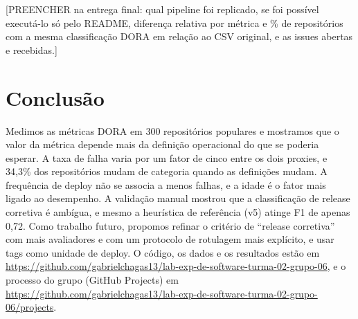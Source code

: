 \documentclass[12pt]{article}
\begin{document}
[PREENCHER na entrega final: qual pipeline foi replicado, se foi possível
executá-lo só pelo README, diferença relativa por métrica e \% de repositórios
com a mesma classificação DORA em relação ao CSV original, e as issues abertas
e recebidas.]

\section{Conclusão}

Medimos as métricas DORA em 300 repositórios populares e mostramos que o valor
da métrica depende mais da definição operacional do que se poderia esperar. A
taxa de falha varia por um fator de cinco entre os dois proxies, e 34,3\%
dos repositórios mudam de categoria quando as definições mudam. A frequência de
deploy não se associa a menos falhas, e a idade é o fator mais ligado ao
desempenho. A validação manual mostrou que a classificação de release
corretiva é ambígua, e mesmo a heurística de referência (v5) atinge F1 de
apenas 0,72. Como trabalho futuro, propomos refinar o critério de ``release
corretiva'' com mais avaliadores e com um protocolo de rotulagem mais
explícito, e usar tags como unidade de deploy. O código, os dados e os resultados estão em
\url{https://github.com/gabrielchagas13/lab-exp-de-software-turma-02-grupo-06},
e o processo do grupo (GitHub Projects) em
\url{https://github.com/gabrielchagas13/lab-exp-de-software-turma-02-grupo-06/projects}.



\end{document}
